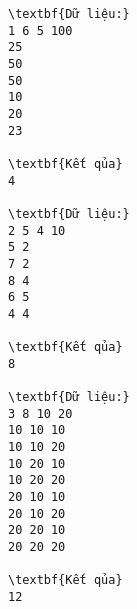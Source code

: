 \begin{verbatim}
\textbf{Dữ liệu:}
1 6 5 100
25
50
50
10
20
23

\textbf{Kết qủa}
4

\textbf{Dữ liệu:}
2 5 4 10
5 2
7 2
8 4
6 5
4 4

\textbf{Kết qủa}
8

\textbf{Dữ liệu:}
3 8 10 20
10 10 10
10 10 20
10 20 10
10 20 20
20 10 10
20 10 20
20 20 10
20 20 20

\textbf{Kết qủa}
12
\end{verbatim}